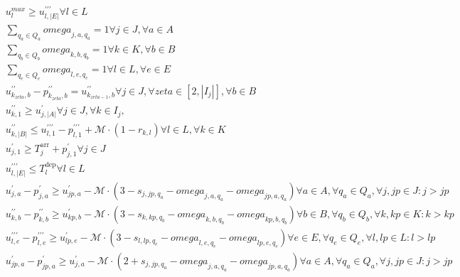 \begin{align}
  & u_{l}^{max} \geq u_{l , \left|E\right|}^{' ' '} \forall l \in L \tag{eq\_0018} \\
  & \sum_{q_{a} \in Q_{a}} \mathit{omega}_{j , a , q_{a}} = 1 \forall j \in J , \forall a \in A \tag{eq\_0019} \\
  & \sum_{q_{b} \in Q_{b}} \mathit{omega}_{k , b , q_{b}} = 1 \forall k \in K , \forall b \in B \tag{eq\_0021} \\
  & \sum_{q_{e} \in Q_{e}} \mathit{omega}_{l , e , q_{e}} = 1 \forall l \in L , \forall e \in E \tag{eq\_0022} \\
  & u_{k_{\mathit{zeta}} , b}^{' '} - p_{k_{\mathit{zeta}} , b}^{' '} = u_{k_{\mathit{zeta} - 1} , b}^{' '} \forall j \in J , \forall \mathit{zeta} \in \left[2 , \left|I_{j}\right|\right] , \forall b \in B \tag{eq\_0023} \\
  & u_{k , 1}^{' '} \geq u_{j , \left|A\right|}^{'} \forall j \in J , \forall k \in I_{j} , \tag{eq\_0024} \\
  & u_{k , \left|B\right|}^{' '} \leq u_{l , 1}^{' ' '} - p_{l , 1}^{' ' '} + \mathcal{M} \cdot \left(1 - r_{k , l}\right) \forall l \in L , \forall k \in K \tag{eq\_0026} \\
  & u_{j , 1}^{'} \geq T_{j}^{\text{arr}} + p_{j , 1}^{'} \forall j \in J \tag{eq\_0027} \\
  & u_{l , \left|E\right|}^{' ' '} \leq T_{l}^{\text{dep}} \forall l \in L \tag{eq\_0029} \\
  & u_{j , a}^{'} - p_{j , a}^{'} \geq u_{jp , a}^{'} - \mathcal{M} \cdot \left(3 - s_{j , jp , q_{a}} - \mathit{omega}_{j , a , q_{a}} - \mathit{omega}_{jp , a , q_{a}}\right) \forall a \in A , \forall q_{a} \in Q_{a} , \forall j , jp \in J : j > jp \tag{eq\_0030} \\
  & u_{k , b}^{' '} - p_{k , b}^{' '} \geq u_{kp , b}^{'} - \mathcal{M} \cdot \left(3 - s_{k , kp , q_{b}} - \mathit{omega}_{k , b , q_{b}} - \mathit{omega}_{kp , b , q_{b}}\right) \forall b \in B , \forall q_{b} \in Q_{b} , \forall k , kp \in K : k > kp \tag{eq\_0032} \\
  & u_{l , e}^{' ' '} - p_{l , e}^{' ' '} \geq u_{lp , e}^{'} - \mathcal{M} \cdot \left(3 - s_{l , lp , q_{e}} - \mathit{omega}_{l , e , q_{e}} - \mathit{omega}_{lp , e , q_{e}}\right) \forall e \in E , \forall q_{e} \in Q_{e} , \forall l , lp \in L : l > lp \tag{eq\_0033} \\
  & u_{jp , a}^{'} - p_{jp , a}^{'} \geq u_{j , a}^{'} - \mathcal{M} \cdot \left(2 + s_{j , jp , q_{a}} - \mathit{omega}_{j , a , q_{a}} - \mathit{omega}_{jp , a , q_{a}}\right) \forall a \in A , \forall q_{a} \in Q_{a} , \forall j , jp \in J : j > jp \tag{eq\_0034} \\

\end{align}
